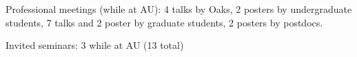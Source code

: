 \begin{veryTightItemize}
    \item Professional meetings (while at AU): 4 talks by Oaks,
        2 posters by undergraduate students,
        7 talks and 2 poster by graduate students,
        2 posters by postdocs.
    \item Invited seminars: 3 while at AU (13 total)
\end{veryTightItemize}

